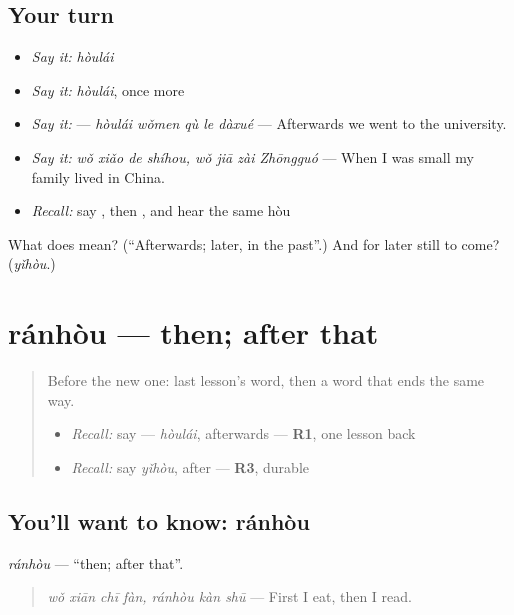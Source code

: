 \subsection*{Your turn}
\begin{itemize}
\raggedright
  \item \emph{Say it:} \emph{hòulái}
  \item \emph{Say it:} \emph{hòulái}, once more
  \item \emph{Say it:}  — \emph{hòulái wǒmen qù le dàxué} — Afterwards we went to the university.
  \item \emph{Say it:} \emph{wǒ xiǎo de shíhou, wǒ jiā zài Zhōngguó} — When I was small my family lived in China.
  \item \emph{Recall:} say , then , and hear the same hòu
\end{itemize}

\begin{tcolorbox}[breakable,colback=teal!4,colframe=teal!35!black,title={Before you move on}]
What does  mean? (\textquotedblleft{}Afterwards; later, in the past\textquotedblright{}.) And for later still to come? (\emph{yǐhòu}.)
\end{tcolorbox}
\section[ránhòu]{ránhòu — then; after that}

\label{lesson:ZH-C150-ranhou}



\begin{quote}
Before the new one: last lesson's word, then a word that ends the same way.

\begin{itemize}
\raggedright
  \item \emph{Recall:} say  — \emph{hòulái}, afterwards — \textbf{R1}, one lesson back
  \item \emph{Recall:} say \emph{yǐhòu}, after — \textbf{R3}, durable
\end{itemize}
\end{quote}

\subsection*{You'll want to know: ránhòu}
\emph{ránhòu} — \textquotedblleft{}then; after that\textquotedblright{}.

\begin{quote}
\emph{wǒ xiān chī fàn, ránhòu kàn shū} — First I eat, then I read.
\end{quote}

